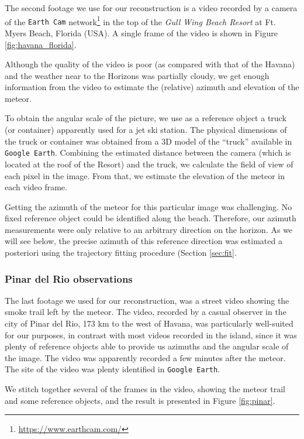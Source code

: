 \documentclass[fleqn,usenatbib]{mnras}
\newcommand{\GoogleEarth}{{\tt Google Earth}}
\begin{document}
The second footage we use for our reconstruction is a video recorded by a camera of the {\tt Earth Cam} network\footnote{\url{https://www.earthcam.com/}} in the top of the {\it Gull Wing Beach Resort} at Ft. Myers Beach, Florida (USA).  A single frame of the video is shown in Figure \ref{fig:havana_florida}.

Although the quality of the video is poor (as compared with that of the Havana) and the weather near to the Horizons was partially cloudy, we get enough information from the video to estimate the (relative) azimuth and elevation of the meteor.

To obtain the angular scale of the picture, we use as a reference object a truck (or container) apparently used for a jet ski station.  The physical dimensions of the truck or container was obtained from a 3D model of the ``truck'' available in {\tt Google Earth}. Combining the estimated distance between the camera (which is located at the roof of the Resort) and the truck, we calculate the field of view of each pixel in the image.  From that, we estimate the elevation of the meteor in each video frame.

Getting the azimuth of the meteor for this particular image was challenging. No fixed reference object could be identified along the beach.  Therefore, our azimuth measurements were only relative to an arbitrary direction on the horizon.  As we will see below, the precise azimuth of this reference direction was estimated a posteriori using the trajectory fitting procedure (Section \ref{sec:fit}.  

\subsubsection{Pinar del Rio observations}
\label{sec:pinar_observations}

The last footage we used for our reconstruction, was a street video showing the smoke trail left by the meteor. The video, recorded by a casual observer in the city of Pinar del Rio, 173 km to the west of Havana, was particularly well-suited for our purposes, in contrast with most videos recorded in the island, since it was plenty of reference objects able to provide us azimuths and the angular scale of the image. The video was apparently recorded a few minutes after the meteor. The site of the video was plenty identified in \GoogleEarth. 

We stitch together several of the frames in the video, showing the meteor trail and some reference objects, and the result is presented in Figure \ref{fig:pinar}.
\end{document}
